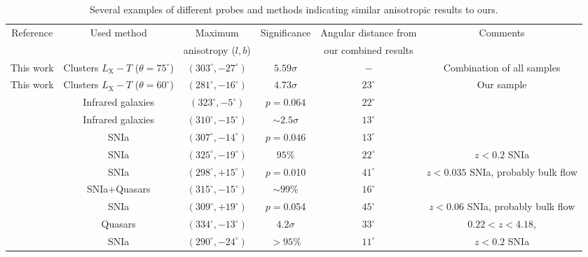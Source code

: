 \documentclass{aa}   %
\begin{document}
\begin{table}[hbtp]
\caption{\small{Several examples of different probes and methods indicating similar anisotropic results to ours.}}
\label{studies}
\begin{center}
\tiny
\begin{tabular}{ c  c  c  c  c | c}
\hline \hline


Reference  & Used method & Maximum & Significance & Angular distance from & Comments\\
 & & anisotropy ($l,b$) &  & our combined results & \\
\hline \hline

This work   & Clusters $L_{\text{X}}-T$ ($\theta=75^{\circ}$) & $(303^{\circ}, -27^{\circ})$&  $5.59\sigma$ & $-$ & Combination of all samples \\ 
This work   & Clusters $L_{\text{X}}-T$ ($\theta=60^{\circ}$)& $(281^{\circ}, -16^{\circ})$ & $4.73\sigma$ & $23^{\circ}$ & Our sample \\ \hline
  \citet{Bengaly2017}  & Infrared galaxies  & $(323^{\circ}, -5^{\circ})$ & $p=0.064$ &  $22^{\circ}$ & \\
 \citet{yoon}  & Infrared galaxies  & $(310^{\circ}, -15^{\circ})$ & $\sim 2.5\sigma$ &  $13^{\circ}$ & \\
  \citet{yang}  & SNIa  & $(307^{\circ}, -14^{\circ})$ & $p=0.046$ &  $13^{\circ}$ & \\
  \citet{kalus}  & SNIa  & $(325^{\circ}, -19^{\circ})$ & $95\% $ &  $22^{\circ}$ & $z<0.2$ SNIa\\
  \citet{feindt}  & SNIa  & $(298^{\circ}, +15^{\circ})$ & $p=$0.010 &  $41^{\circ}$ & $z<0.035$ SNIa, probably bulk flow\\
  \citet{mariano}  & SNIa+Quasars  & $(315^{\circ}, -15^{\circ})$ & $\sim 99\%$ &  $16^{\circ}$ & \\
  \citet{colin2011}   & SNIa & $(309^{\circ}, +19^{\circ})$& $p=$0.054 & $45^{\circ}$ & $z<0.06$ SNIa, probably bulk flow\\ 
   \citet{webb}   & Quasars & $(334^{\circ}, -13^{\circ})$& $4.2\sigma$ & $33^{\circ}$ & $0.22<z<4.18$, \\ 
  \citet{schwarz}  & SNIa  & $(290^{\circ}, -24^{\circ})$ & $>95\%$ &  $11^{\circ}$ & $z<0.2$ SNIa\\ \hline

\end{tabular}
\end{center}
\end{table}
\end{document}

